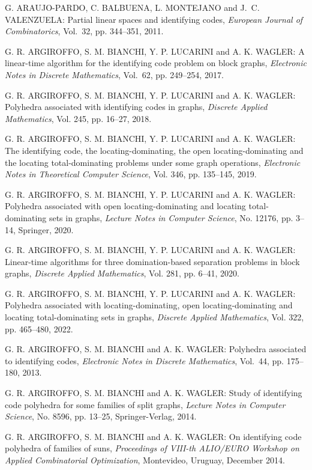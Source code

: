 \begin{thebibliography}{999}
G. ARAUJO-PARDO, C. BALBUENA, L. MONTEJANO and J.~C. VALENZUELA: Partial linear spaces and identifying codes, {\it European Journal of Combinatorics}, Vol.~32, pp. 344--351, 2011.

G. R. ARGIROFFO, S. M. BIANCHI, Y. P. LUCARINI and A. K. WAGLER: A linear-time algorithm for the identifying code problem on block graphs, {\it Electronic Notes in Discrete Mathematics}, Vol.~62, pp. 249--254, 2017.

G. R. ARGIROFFO, S. M. BIANCHI, Y. P. LUCARINI and A. K. WAGLER: Polyhedra associated with identifying codes in graphs, {\it Discrete Applied Mathematics}, Vol. 245, pp. 16--27, 2018.

G. R. ARGIROFFO, S. M. BIANCHI, Y. P. LUCARINI and A. K. WAGLER: The identifying code, the locating-dominating, the open locating-dominating and the locating total-dominating problems under some graph operations, {\it Electronic Notes in Theoretical Computer Science}, Vol. 346, pp. 135--145, 2019.

G. R. ARGIROFFO, S. M. BIANCHI, Y. P. LUCARINI and A. K. WAGLER: Polyhedra associated with open locating-dominating and locating total-dominating sets in graphs, {\it Lecture Notes in Computer Science}, No. 12176, pp. 3--14, Springer, 2020.

G. R. ARGIROFFO, S. M. BIANCHI, Y. P. LUCARINI and A. K. WAGLER: Linear-time algorithms for three domination-based separation problems in block graphs, {\it Discrete Applied Mathematics}, Vol. 281, pp. 6--41, 2020.

G. R. ARGIROFFO, S. M. BIANCHI, Y. P. LUCARINI and A. K. WAGLER: Polyhedra associated with locating-dominating, open locating-dominating and locating total-dominating sets in graphs, {\it Discrete Applied Mathematics}, Vol. 322, pp. 465--480, 2022.

G. R. ARGIROFFO, S. M. BIANCHI and A. K. WAGLER: Polyhedra associated to identifying codes, {\it Electronic Notes in Discrete Mathematics}, Vol.~44, pp. 175--180, 2013.

G. R. ARGIROFFO, S. M. BIANCHI and A. K. WAGLER: Study of identifying code polyhedra for some families of split graphs, {\it Lecture Notes in Computer Science}, No. 8596, pp. 13--25, Springer-Verlag, 2014.

G. R. ARGIROFFO, S. M. BIANCHI and A. K. WAGLER: On identifying code polyhedra of families of suns, {\it Proceedings of VIII-th ALIO/EURO Workshop on Applied Combinatorial Optimization}, Montevideo, Uruguay, December 2014.


\end{thebibliography}
